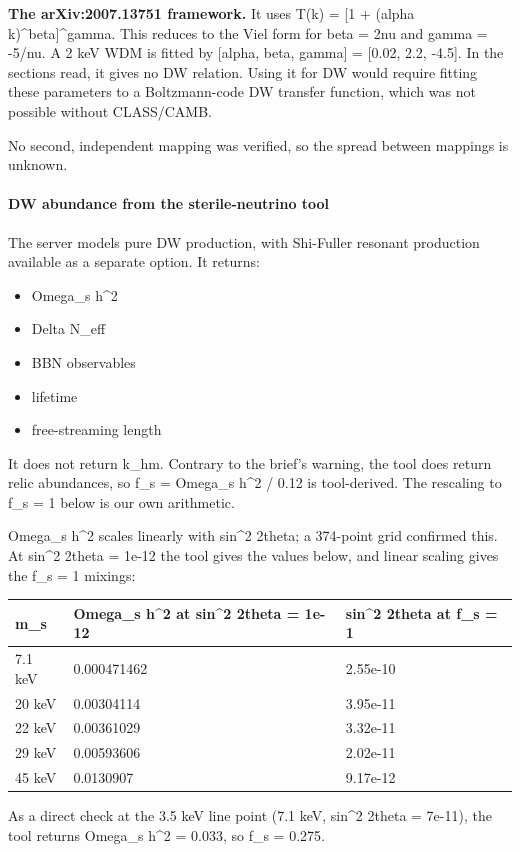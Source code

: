 \documentclass[11pt,a4paper]{article}
\begin{document}
\textbf{The arXiv:2007.13751 framework.} It uses T(k) = [1 + (alpha k)\textasciicircum{}beta]\textasciicircum{}gamma. This reduces to the Viel form for beta = 2nu and gamma = -5/nu. A 2 keV WDM is fitted by [alpha, beta, gamma] = [0.02, 2.2, -4.5]. In the sections read, it gives no DW relation. Using it for DW would require fitting these parameters to a Boltzmann-code DW transfer function, which was not possible without CLASS/CAMB.

No second, independent mapping was verified, so the spread between mappings is unknown.

\paragraph{DW abundance from the sterile-neutrino tool}
The server models pure DW production, with Shi-Fuller resonant production available as a separate option. It returns:

\begin{itemize}
  \item Omega\_s h\textasciicircum{}2
  \item Delta N\_eff
  \item BBN observables
  \item lifetime
  \item free-streaming length
\end{itemize}
It does not return k\_hm. Contrary to the brief's warning, the tool does return relic abundances, so f\_s = Omega\_s h\textasciicircum{}2 / 0.12 is tool-derived. The rescaling to f\_s = 1 below is our own arithmetic.

Omega\_s h\textasciicircum{}2 scales linearly with sin\textasciicircum{}2 2theta; a 374-point grid confirmed this. At sin\textasciicircum{}2 2theta = 1e-12 the tool gives the values below, and linear scaling gives the f\_s = 1 mixings:

\begin{longtable}{@{}p{}p{}p{}@{}}
\toprule
\textbf{m\_s} & \textbf{Omega\_s h\textasciicircum{}2 at sin\textasciicircum{}2 2theta = 1e-12} & \textbf{sin\textasciicircum{}2 2theta at f\_s = 1} \\ \midrule \endhead
7.1 keV & 0.000471462 & 2.55e-10 \\
20 keV & 0.00304114 & 3.95e-11 \\
22 keV & 0.00361029 & 3.32e-11 \\
29 keV & 0.00593606 & 2.02e-11 \\
45 keV & 0.0130907 & 9.17e-12 \\
\bottomrule\end{longtable}
As a direct check at the 3.5 keV line point (7.1 keV, sin\textasciicircum{}2 2theta = 7e-11), the tool returns Omega\_s h\textasciicircum{}2 = 0.033, so f\_s = 0.275.
\end{document}
